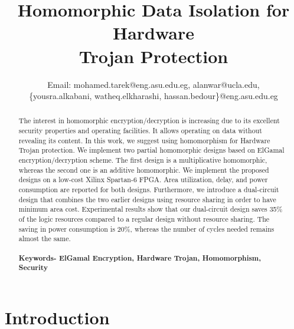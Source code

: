 \documentclass[conference]{IEEEtran}
\begin{document}
\title{\Huge{Homomorphic Data Isolation for Hardware \\ Trojan Protection}}


\author{
Email: mohamed.tarek@eng.asu.edu.eg, alanwar@ucla.edu, \\ \{yousra.alkabani, watheq.elkharashi, hassan.bedour\}@eng.asu.edu.eg}


\maketitle

\vspace{10pt}
\begin{abstract}
The interest in homomorphic encryption/decryption is increasing due to its excellent security properties and operating facilities. It allows operating on data without revealing its content. In this work, we suggest using homomorphism for Hardware Trojan protection. We implement two partial homomorphic designs based on ElGamal encryption/decryption scheme. The first design is a multiplicative homomorphic, whereas the second one is an additive homomorphic. We implement the proposed designs on a low-cost Xilinx Spartan-6 FPGA. Area utilization, delay, and power consumption are reported for both designs. Furthermore, we introduce a dual-circuit design that combines the two earlier designs using resource sharing in order to have minimum area cost. Experimental results show that our dual-circuit design saves 35\% of the logic resources compared to a regular design without resource sharing. The saving in power consumption is 20\%, whereas the number of cycles needed remains almost the same. 
\\ \\ 
\small\textbf{Keywords- ElGamal Encryption, Hardware Trojan, Homomorphism, Security}

\end{abstract}






\section{Introduction}
\end{document}
